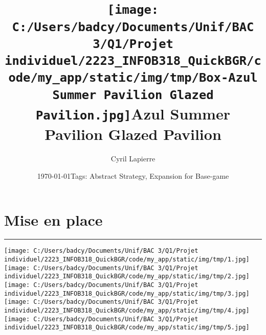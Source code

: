 \documentclass{scrartcl}%
\title{\texttt{[image: C:/Users/badcy/Documents/Unif/BAC 3/Q1/Projet individuel/2223\_INFOB318\_QuickBGR/code/my\_app/static/img/tmp/Box-Azul Summer Pavilion Glazed Pavilion.jpg]}\break Azul Summer Pavilion Glazed Pavilion }%
\author{Cyril Lapierre}%
\date{\today \break Tags: Abstract Strategy, Expansion for Base-game}%
\begin{document}
%
\normalsize%
\maketitle\thispagestyle{header}%
\pagestyle{header}%
\sectionfont{\color{blue}}%
\subsectionfont{\color{blue}}%
\subsubsectionfont{\color{blue}}%
\section{ Mise en place
}%
\label{sec:Miseenplace}%
\textcolor{blue}{\rule{18cm}{0.07cm}}\break%
%
\texttt{[image: C:/Users/badcy/Documents/Unif/BAC 3/Q1/Projet individuel/2223\_INFOB318\_QuickBGR/code/my\_app/static/img/tmp/1.jpg]}%
%
\texttt{[image: C:/Users/badcy/Documents/Unif/BAC 3/Q1/Projet individuel/2223\_INFOB318\_QuickBGR/code/my\_app/static/img/tmp/2.jpg]}%
%
\texttt{[image: C:/Users/badcy/Documents/Unif/BAC 3/Q1/Projet individuel/2223\_INFOB318\_QuickBGR/code/my\_app/static/img/tmp/3.jpg]}%
%
\texttt{[image: C:/Users/badcy/Documents/Unif/BAC 3/Q1/Projet individuel/2223\_INFOB318\_QuickBGR/code/my\_app/static/img/tmp/4.jpg]}%
%
\texttt{[image: C:/Users/badcy/Documents/Unif/BAC 3/Q1/Projet individuel/2223\_INFOB318\_QuickBGR/code/my\_app/static/img/tmp/5.jpg]}%
\end{document}
